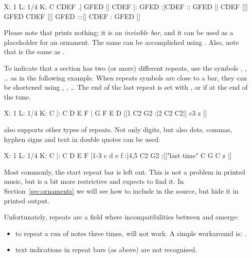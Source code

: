 \documentclass[a4paper,fullpage,12pt]{book}
\begin{document}
\begin{abcsource}
X: 1
L: 1/4
K: C
CDEF .| GFED [| CDEF |: GFED :|CDEF :: GFED || CDEF [|] GFED
CDEF |[| GFED :::|] CDEF : GFED |]
\end{abcsource}


Please note that \cmd{[|]} prints nothing; it is an \emph{invisible
bar}, and it can be used as a placeholder for an ornament. The same
can be accomplished using \cmd{[]}. Also, note that \cmd{:} is the
same as .

To indicate that a section has two (or more) different repeats, use
the symbols \cmd{[1}, \cmd{[2}, {\ldots} as in the following example.
When repeats symbols are close to a bar, they can be shortened using
, , {\ldots} The end of the last repeat
is set with \cmd{\textbar\textbar}, or \cmd{\textbar]} if at the end
of the tune.

\begin{abcsource}
X: 1
L: 1/4
K: C
|: C D E F | G F E D |[1 C2 G2 :|2 C2 C2|| c3 z |]
\end{abcsource}


\abcm{} also supports other types of repeats. Not only digits, but
also dots, commas, hyphen signs and text in double quotes can be used:

\begin{abcsource}
X: 1
L: 1/4
K: C
|: C D E F |1-3 c d e f :|4,5 C2 G2 :|["last time" C G C z |]
\end{abcsource}



Most commonly, the start repeat bar \cmd{|:} is left out. This is not
a problem in printed music, but \abcMID{} is a bit more restrictive
and expects to find it. In Section~\ref{sec:ornaments} we will see how
to include \cmd{|:} in the source, but hide it in printed output.

\begin{warn}

  Unfortunately, repeats are a field where incompatibilities between
  \abcm{} and \abcMID{} emerge:
  
  \begin{itemize}
    
    \item to repeat a run of notes three times, \cmd{|:: ::|} will not
    work. A simple workaround is: .
    
    \item text indications in repeat bars (as  above)
    are not recognised.    
    
  \end{itemize}

\end{warn}
\end{document}
